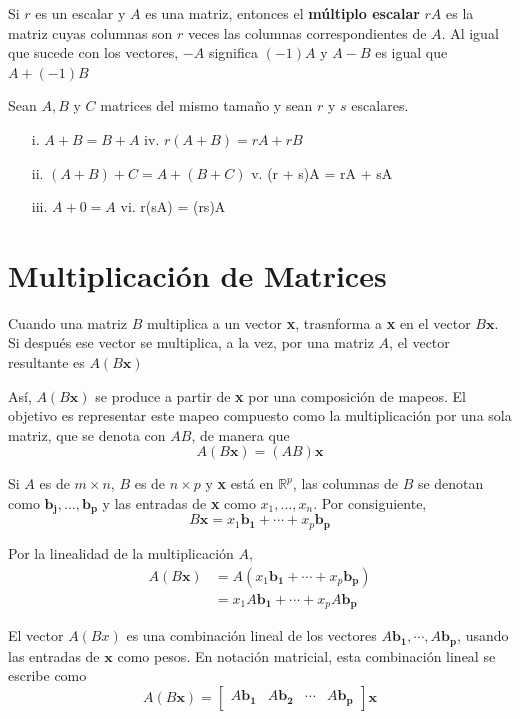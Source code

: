 \documentclass{article}
\begin{document}
Si $r$ es un escalar y $A$ es una matriz, entonces el \textbf{múltiplo escalar} $rA$ es la matriz cuyas columnas son $r$ veces las columnas correspondientes de $A$. Al igual que sucede con los vectores, $-A$ significa $(-1)A$ y $A-B$ es igual que $A + (-1)B$

\begin{tcolorbox}[colback=green!20!white,colframe=green!80!black,title=Propiedades de una Matriz]
    Sean $A, B$ y $C$ matrices del mismo tamaño y sean $r$ y $s$ escalares.
    \begin{itemize}
        \item[i.] $A + B = B + A$ \hspace{80 mm} iv. $r(A + B) = rA + rB$ 
        \item[ii.] $(A + B) + C = A + (B + C)$ \hspace{60 mm} v. (r + s)A = rA + sA
        \item[iii.] $A + 0 = A$  \hspace{88 mm} vi. r(sA) = (rs)A
    \end{itemize}
\end{tcolorbox}

\section*{Multiplicación de Matrices}

Cuando una matriz $B$ multiplica a un vector \textbf{x}, trasnforma a \textbf{x} en el vector $B\mathbf{x}$. Si después ese vector se multiplica, a la vez, por una matriz $A$, el vector resultante es $A(B\mathbf{x})$


Así, $A(B\mathbf{x})$ se produce a partir de \textbf{x} por una composición de mapeos. El objetivo es representar este mapeo compuesto como la multiplicación por una sola matriz, que se denota con $AB$, de manera que $$A(B\mathbf{x}) = (AB)\mathbf{x}$$


Si $A$ es de $m \times n$, $B$ es de $n \times p$ y \textbf{x} está en $\mathbb{R}^p$, las columnas de $B$ se denotan como $\mathbf{b_j}, \dots, \mathbf{b_p}$ y las entradas de \textbf{x} como $ x_1,\dots, x_n$. Por consiguiente, $$B\mathbf{x} = x_1\mathbf{b_1} + \dotsb + x_p\mathbf{b_p}$$

Por la linealidad de la multiplicación $A$, 
\begin{equation*}
    \begin{aligned}
        A(B\mathbf{x}) &= A(x_1\mathbf{b_1} + \dotsb + x_p\mathbf{b_p})\\
                       &= x_1A\mathbf{b_1} + \dotsb + x_pA\mathbf{b_p}
    \end{aligned}
\end{equation*}

El vector $A(Bx)$ es una combinación lineal de los vectores $A\mathbf{b_1}, \dotsb, A\mathbf{b_p}$, usando las entradas de $\mathbf{x}$ como pesos. En notación matricial, esta combinación lineal se escribe como $$A(B\mathbf{x}) = \begin{bmatrix}
    A\mathbf{b_1} & A\mathbf{b_2} & \dotsb & A\mathbf{b_p}
\end{bmatrix}\mathbf{x}$$
\end{document}
